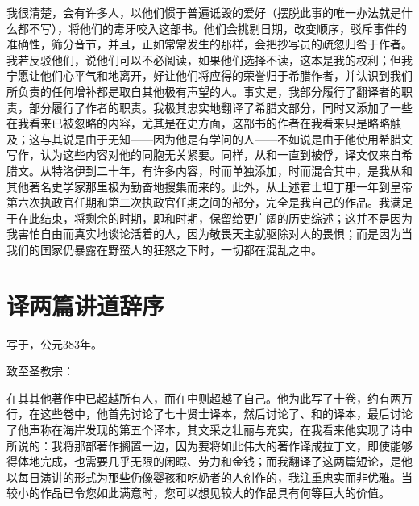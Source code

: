 我很清楚，会有许多人，以他们惯于普遍诋毁的爱好（摆脱此事的唯一办法就是什么都不写），将他们的毒牙咬入这部书。他们会挑剔日期，改变顺序，驳斥事件的准确性，筛分音节，并且，正如常常发生的那样，会把抄写员的疏忽归咎于作者。我若反驳他们，说他们可以不必阅读，如果他们选择不读，这本是我的权利；但我宁愿让他们心平气和地离开，好让他们将应得的荣誉归于希腊作者，并认识到我们所负责的任何增补都是取自其他极有声望的人。事实是，我部分履行了翻译者的职责，部分履行了作者的职责。我极其忠实地翻译了希腊文部分，同时又添加了一些在我看来已被忽略的内容，尤其是在史方面，这部书的作者在我看来只是略略触及；这与其说是由于无知——因为他是有学问的人——不如说是由于他使用希腊文写作，认为这些内容对他的同胞无关紧要。同样，从和一直到被俘，译文仅来自希腊文。从特洛伊到二十年，有许多内容，时而单独添加，时而混合其中，是我从和其他著名史学家那里极为勤奋地搜集而来的。此外，从上述君士坦丁那一年到皇帝第六次执政官任期和第二次执政官任期之间的部分，完全是我自己的作品。我满足于在此结束，将剩余的时期，即和时期，保留给更广阔的历史综述；这并不是因为我害怕自由而真实地谈论活着的人，因为敬畏天主就驱除对人的畏惧；而是因为当我们的国家仍暴露在野蛮人的狂怒之下时，一切都在混乱之中。\par


\section{译两篇讲道辞序}

写于，公元383年。\par

致至圣教宗：\par

在其其他著作中已超越所有人，而在中则超越了自己。他为此写了十卷，约有两万行，在这些卷中，他首先讨论了七十贤士译本，然后讨论了、和的译本，最后讨论了他声称在海岸发现的第五个译本，其文采之壮丽与充实，在我看来他实现了诗中所说的：我将那部著作搁置一边，因为要将如此伟大的著作译成拉丁文，即使能够得体地完成，也需要几乎无限的闲暇、劳力和金钱；而我翻译了这两篇短论，是他以每日演讲的形式为那些仍像婴孩和吃奶者的人创作的，我注重忠实而非优雅。当较小的作品已令您如此满意时，您可以想见较大的作品具有何等巨大的价值。\par

